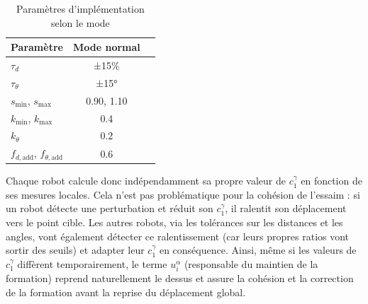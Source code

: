 \begin{table}[h]
\centering
\begin{tabular}{|l|c|c|}
\hline
\textbf{Paramètre}  & \textbf{Mode normal} \\
\hline
$\tau_d$ & ±15\% \\
$\tau_\theta$  & ±15° \\
$s_{\min}$, $s_{\max}$  & 0.90, 1.10 \\
$k_{\min}$, $k_{\max}$ & 0.4 \\
$k_\theta$  & 0.2 \\
$f_{d,\text{add}}$, $f_{\theta,\text{add}}$ & 0.6 \\

\hline
\end{tabular}
\caption{Paramètres d'implémentation selon le mode}
\end{table}

Chaque robot calcule donc indépendamment sa propre valeur de $c_{1}^{\gamma}$ en fonction de ses mesures locales. Cela n'est pas problématique pour la cohésion de l'essaim : si un robot détecte une perturbation et réduit son $c_{1}^{\gamma}$, il ralentit son déplacement vers le point cible. Les autres robots, via les tolérances sur les distances et les angles, vont également détecter ce ralentissement (car leurs propres ratios vont sortir des seuils) et adapter leur $c_{1}^{\gamma}$ en conséquence. Ainsi, même si les valeurs de $c_{1}^{\gamma}$ diffèrent temporairement, le terme $u_i^\alpha$ (responsable du maintien de la formation) reprend naturellement le dessus et assure la cohésion et la correction de la formation avant la reprise du déplacement global.




